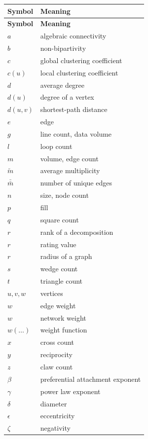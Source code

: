 \documentclass{article}
\begin{document}
\begin{longtable}{ll}
  \toprule
  \textbf{Symbol} & \textbf{Meaning} \\
  \midrule
  \endfirsthead
  \toprule
  \textbf{Symbol} & \textbf{Meaning} \\
  \midrule
  \endhead
  \bottomrule
  \endfoot
  \bottomrule
  \endlastfoot
  $a$ & algebraic connectivity \\
  $b$ & non-bipartivity \\
  $c$ & global clustering coefficient \\
  $c(u)$ & local clustering coefficient \\
  $d$ & average degree \\
  $d(u)$ & degree of a vertex \\
  $d(u,v)$ & shortest-path distance \\
  $e$ & edge \\
  $g$ & line count, data volume \\
  $l$ & loop count \\
  $m$ & volume, edge count \\
  $\tilde{m}$ & average multiplicity \\
  $\bar{\bar m}$ & number of unique edges \\
  $n$ & size, node count \\
  $p$ & fill \\
  $q$ & square count \\
  $r$ & rank of a decomposition \\
  $r$ & rating value \\
  $r$ & radius of a graph \\
  $s$ & wedge count \\
  $t$ & triangle count \\
  $u, v, w$ & vertices \\
  $w$ & edge weight \\ 
  $w$ & network weight \\
  $w(\ldots)$ & weight function \\
  $x$ & cross count \\
  $y$ & reciprocity \\
  $z$ & claw count \\
\midrule
  $\beta$  & preferential attachment exponent \\
  $\gamma$ & power law exponent \\
  $\delta$ & diameter \\
  $\epsilon$ & eccentricity \\
  $\zeta$ & negativity \\

\end{longtable}
\end{document}
